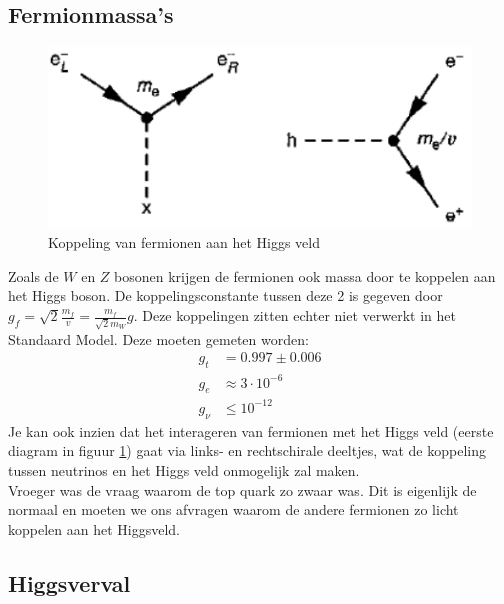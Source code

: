 \documentclass[../main.tex]{subfiles}
\begin{document}
\subsection{Fermionmassa's}%
\label{sub:fermion_massa_s}

\begin{figure}[h]
    \centering
    \includegraphics[width=0.6\linewidth]{higgs_boson/koppeling_higgs_e.png}
    \caption{Koppeling van fermionen aan het Higgs veld}%
    \label{fig:higgs_boson/koppeling_higgs_e}
\end{figure}

Zoals de $W$ en $Z$ bosonen krijgen de fermionen ook massa door te koppelen aan het Higgs boson. De koppelingsconstante tussen deze 2 is gegeven door $g_f = \sqrt{2} \frac{m_f}{v} = \frac{m_f}{\sqrt{2}m_W} g$. Deze koppelingen zitten echter niet verwerkt in het Standaard Model. Deze moeten gemeten worden:
\begin{equation}
    \begin{aligned}
        \label{eq:kc_h_fermionen}
        g_t &= 0.997 \pm 0.006\\
        g_e &\approx 3\cdot 10^{-6}\\
        g_\nu &\leq 10^{-12}
    \end{aligned}
\end{equation}
Je kan ook inzien dat het interageren van fermionen met het Higgs veld (eerste diagram in figuur \ref{fig:higgs_boson/koppeling_higgs_e}) gaat via links- en rechtschirale deeltjes, wat de koppeling tussen neutrinos en het Higgs veld onmogelijk zal maken.\\
Vroeger was de vraag waarom de top quark zo zwaar was. Dit is eigenlijk de normaal en moeten we ons afvragen waarom de andere fermionen zo licht koppelen aan het Higgsveld.

\subsection{Higgsverval}%
\label{sub:higgs_verval}
\end{document}
